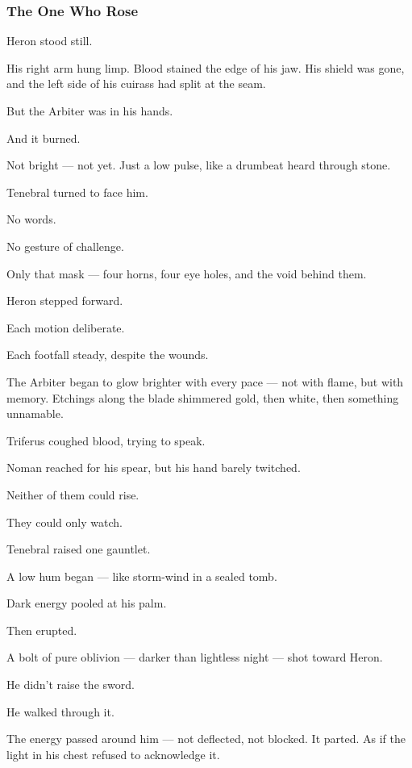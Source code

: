 \documentclass[12pt]{article}
\begin{document}
\dotfill

\subsubsection*{The One Who Rose}

Heron stood still.

His right arm hung limp. Blood stained the edge of his jaw. His shield was gone, and the left side of his cuirass had split at the seam.

But the Arbiter was in his hands.

And it burned.

Not bright — not yet. Just a low pulse, like a drumbeat heard through stone.

\bigskip

Tenebral turned to face him.

No words.

No gesture of challenge.

Only that mask — four horns, four eye holes, and the void behind them.

Heron stepped forward.

Each motion deliberate.

Each footfall steady, despite the wounds.

The Arbiter began to glow brighter with every pace — not with flame, but with memory. Etchings along the blade shimmered gold, then white, then something unnamable.

Triferus coughed blood, trying to speak.

Noman reached for his spear, but his hand barely twitched.

Neither of them could rise.

They could only watch.

\bigskip

Tenebral raised one gauntlet.

A low hum began — like storm-wind in a sealed tomb.

Dark energy pooled at his palm.

Then erupted.

A bolt of pure oblivion — darker than lightless night — shot toward Heron.

He didn’t raise the sword.

He walked through it.

The energy passed around him — not deflected, not blocked. It parted. As if the light in his chest refused to acknowledge it.
\end{document}
